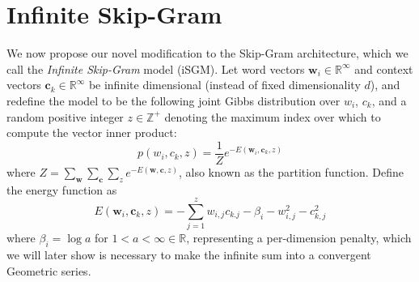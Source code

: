 \documentclass{article} %
\begin{document}
\section{Infinite Skip-Gram}
We now propose our novel modification to the Skip-Gram architecture, which we call the \textit{Infinite Skip-Gram} model (iSGM).  Let word vectors $\mathbf{w}_{i} \in \mathbb{R}^{\infty}$ and context vectors $\mathbf{c}_{k} \in \mathbb{R}^{\infty}$ be infinite dimensional (instead of fixed dimensionality $d$), and redefine the model to be the following joint Gibbs distribution over $w_{i}$, $c_{k}$, and a random positive integer $z \in \mathbb{Z}^{+}$ denoting the maximum index over which to compute the vector inner product: \begin{equation}
p(w_{i}, c_{k}, z) = \frac{1}{Z} e^{-E(\mathbf{w}_{i}, \mathbf{c}_{k}, z)} 
\end{equation} where $Z = \sum_{\mathbf{w}} \sum_{\mathbf{c}} \sum_{z} e^{-E(\mathbf{w}, \mathbf{c}, z)}$, also known as the partition function.  Define the energy function as \begin{equation}
E(\mathbf{w}_{i}, \mathbf{c}_{k}, z) = -\sum_{j=1}^{z} w_{i,j}c_{k.j} - \beta_{i} - w_{i,j}^{2} - c_{k,j}^{2}
\end{equation} where $\beta_{i} = \log a$ for $1 < a < \infty \in \mathbb{R}$, representing a per-dimension penalty, which we will later show is necessary to make the infinite sum into a convergent Geometric series.  
\end{document}
